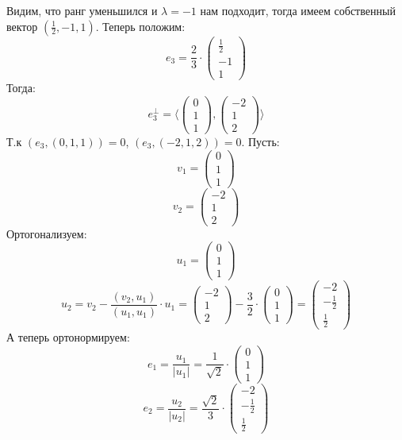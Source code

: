 \documentclass[a4paper,12pt]{article}
\begin{document}
Видим, что ранг уменьшился и $\lambda = -1$ нам подходит, тогда имеем собственный вектор $\left(\frac12, -1, 1\right)$. Теперь положим:
\[
e_3 = \frac23 \cdot \begin{pmatrix}
\frac12 \\ -1 \\ 1
\end{pmatrix}
\]
Тогда:
\[
e_3^\perp = \langle \begin{pmatrix}
0 \\ 1 \\ 1
\end{pmatrix}, \begin{pmatrix}
-2 \\ 1 \\ 2
\end{pmatrix}\rangle
\]
Т.к $(e_3, (0, 1, 1)) = 0$, $(e_3, (-2, 1, 2)) = 0$.
\clearpage
Пусть:
\[
v_1 = \begin{pmatrix}
0 \\ 1 \\ 1
\end{pmatrix}
\]
\[
v_2 = \begin{pmatrix}
-2 \\ 1 \\ 2
\end{pmatrix}
\]
Ортогонализуем:
\[
u_1 =  \begin{pmatrix}
0 \\ 1 \\ 1
\end{pmatrix}
\]
\[
u_2 = v_2 - \frac{(v_2, u_1)}{(u_1, u_1)} \cdot u_1 = \begin{pmatrix}
-2 \\ 1 \\ 2
\end{pmatrix} - \frac{3}{2} \cdot \begin{pmatrix} 0 \\ 1 \\ 1 \end{pmatrix} = \begin{pmatrix} -2 \\ -\frac12 \\ \frac12 \end{pmatrix}
\]
А теперь ортонормируем:
\[
e_1 = \frac{u_1}{|u_1|} = \frac{1}{\sqrt{2}} \cdot \begin{pmatrix}
0 \\ 1 \\ 1
\end{pmatrix}
\]
\[
e_2 = \frac{u_2}{|u_2|} = \frac{\sqrt{2}}{3} \cdot \begin{pmatrix} -2 \\ -\frac12 \\ \frac12 \end{pmatrix}
\]
\end{document}
